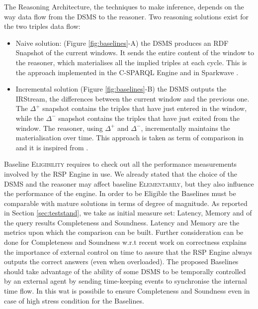 The Reasoning Architecture, the techniques to make inference, depends on the way data flow from the DSMS to the reasoner. Two reasoning solutions exist for the two triples data flow:

\begin{itemize}
\item Naive solution: (Figure \ref{fig:baselines}-A) the DSMS produces an RDF Snapshot of the current windows. It sends the entire content of the window to the reasoner, which materialises all the implied triples at each cycle. This is the approach implemented in the C-SPARQL Engine \cite{DBLP:journals/sigmod/BarbieriBCVG10} and in Sparkwave \cite{DBLP:conf/debs/KomazecCF12}.
\item Incremental solution (Figure \ref{fig:baselines}-B) the DSMS outputs the IRStream, the differences between the current window and the previous one. The $\Delta^{+}$ snapshot contains the triples that have just entered in the window, while the $\Delta^{-}$ snapshot contains the triples that have just exited from the window. The reasoner, using $\Delta^{+}$ and $\Delta^{-}$, incrementally maintains the materialisation over time. This approach is taken as term of comparison in \cite{DellAglio2014} and it is inspired from \cite{DBLP:conf/cikm/RenP11}.
\end{itemize}

Baseline \textsc{Eligibility} requires to check out all the performance measurements involved by the RSP Engine in use. We already stated that the choice of the DSMS and the reasoner may affect baseline \textsc{Elementarily}, but they also influence the performance of the engine. In order to be Eligible the Baselines must be comparable with mature solutions in terms of degree of magnitude. As reported in Section \ref{sec:teststand}, we take as initial measure set: Latency, Memory and of the query results Completeness and Soundness. Latency and Memory are the metrics upon which the comparison can be built. Further consideration can be done for Completeness and Soundness w.r.t recent work on correctness \cite{DBLP:conf/semweb/DellAglioCBCV13}  \cite{DBLP:conf/semweb/DellAglioCBCV13} explains the importance of external control on time to assure that the RSP Engine always outputs the correct answers (even when overloaded). The proposed Baselines should take advantage of the ability of some DSMS to be temporally controlled by an external agent by sending time-keeping events to synchronise the internal time flow. In this wat is possibile to ensure Completeness and Soundness even in case of high stress condition for the Baselines. %

